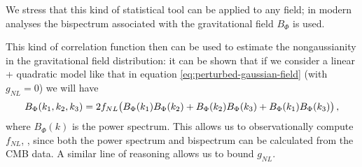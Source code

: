 \documentclass[main.tex]{subfiles}
\begin{document}
We stress that this kind of statistical tool can be applied to any field; in modern analyses the bispectrum associated with the gravitational field \cite[eq.\ 2]{celoriaPrimordialNonGaussianity2018} \(B_\Phi \) is used.

This kind of correlation function then can be used to estimate the nongaussianity in the gravitational field distribution: it can be shown that if we consider a linear + quadratic model like that in equation \eqref{eq:perturbed-gaussian-field} (with \(g_{NL} = 0\)) we will have 
%
\begin{align}
B_{\Phi } (k_1, k_2, k_3 ) = 2 f_{NL}
\qty(B_\Phi (k_1 ) B_\Phi (k_2 ) + B_\Phi (k_2 ) B_\Phi (k_3) + B_\Phi (k_1 ) B_\Phi (k_3 ))
\,,
\end{align}
%
where \(B_\Phi (k)\) is the power spectrum. 
This allows us to observationally compute \(f_{NL}\),  \cite[]{planckcollaborationPlanck2018Results2020}, since both the power spectrum and bispectrum can be calculated from the CMB data.
A similar line of reasoning allows us to bound \(g_{NL}\).

%




\end{document}
